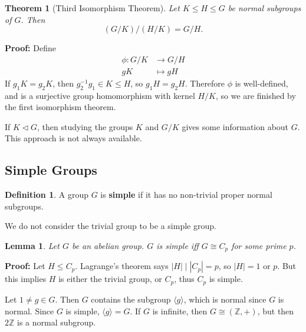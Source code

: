 \documentclass[12pt]{article}
\newtheorem{theorem}{Theorem}[section]
\newtheorem{lemma}{Lemma}[section]
\theoremstyle{definition}
\newtheorem{definition}{Definition}[section]
\theoremstyle{remark}
\begin{document}
\begin{theorem}[Third Isomorphism Theorem]
	Let $K \leq H \leq G$ be normal subgroups of $G$. Then
	\[
		(G/K)/(H/K) = G/H
	.\]
\end{theorem}

\begin{adjustbox}{minipage = \columnwidth - 25.5pt, margin=1em, frame=1pt, margin=0em}
\textbf{Proof:} Define
\begin{align*}
	\phi : G/K &\to G/H \\
	gK &\mapsto gH
\end{align*}
If $g_1K = g_2K$, then $g_2^{-1}g_1 \in K \leq H$, so $g_1H = g_2H$. Therefore $\phi$ is well-defined, and is a surjective group homomorphism with kernel $H/K$, so we are finished by the first isomorphism theorem.

\end{adjustbox}

If $K \lhd G$, then studying the groups $K$ and $G/K$ gives some information about $G$. This approach is not always available.

\subsection{Simple Groups}%
\label{sub:simple_groups}

\begin{definition}
	A group $G$ is \textbf{simple} if it has no non-trivial proper normal subgroups.
\end{definition}

We do not consider the trivial group to be a simple group.

\begin{lemma}
	Let $G$ be an abelian group. $G$ is simple iff $G \cong C_p$ for some prime $p$.
\end{lemma}

\begin{adjustbox}{minipage = \columnwidth - 25.5pt, margin=1em, frame=1pt, margin=0em}
\textbf{Proof:} Let $H \leq C_p$. Lagrange's theorem says $|H| \mid |C_p| = p$, so $|H| = 1$ or $p$. But this implies $H$ is either the trivial group, or $C_p$, thus $C_p$ is simple.

\end{adjustbox}

Let $1 \neq g \in G$. Then $G$ contains the subgroup $\langle g \rangle$, which is normal since $G$ is normal. Since $G$ is simple, $\langle g \rangle = G$. If $G$ is infinite, then $G \cong (\mathbb{Z}, +)$, but then $2 \mathbb{Z}$ is a normal subgroup.
\end{document}
